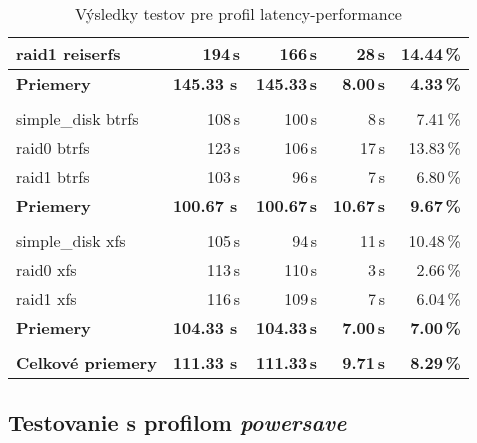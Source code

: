 \begin{table}[H]
\begin{center}
\begin{tabular}{|l|r r r r|}
    raid1 reiserfs & 194\,s & 166\,s & 28\,s & 14.44\,\% \\
    \hline
    \textbf{Priemery} & \textbf{145.33 s}\,& \textbf{145.33\,s} & \textbf{8.00\,s} & \textbf{4.33\,\%} \\
    \hline & \\[-1em]\hline
    simple\_disk btrfs & 108\,s & 100\,s & 8\,s & 7.41\,\% \\
    raid0 btrfs & 123\,s & 106\,s & 17\,s & 13.83\,\% \\
    raid1 btrfs & 103\,s & 96\,s & 7\,s & 6.80\,\% \\
    \hline
    \textbf{Priemery} & \textbf{100.67 s}\,& \textbf{100.67\,s} & \textbf{10.67\,s} & \textbf{9.67\,\%} \\
    \hline & \\[-1em]\hline
    simple\_disk xfs & 105\,s & 94\,s & 11\,s & 10.48\,\% \\
    raid0 xfs & 113\,s & 110\,s & 3\,s & 2.66\,\% \\
    raid1 xfs & 116\,s & 109\,s & 7\,s & 6.04\,\% \\
    \hline
    \textbf{Priemery} & \textbf{104.33 s}\,& \textbf{104.33\,s} & \textbf{7.00\,s} & \textbf{7.00\,\%} \\
    \hline & \\[-1em]\hline
    \textbf{Celkové priemery} & \textbf{111.33 s}\,& \textbf{111.33\,s} & \textbf{9.71\,s} & \textbf{8.29\,\%} \\
    \hline
\end{tabular}
\caption{Výsledky testov pre profil latency-performance}
\label{tab:results-xfs}
\end{center}
\end{table}

\subsection{Testovanie s profilom \emph{powersave}}

